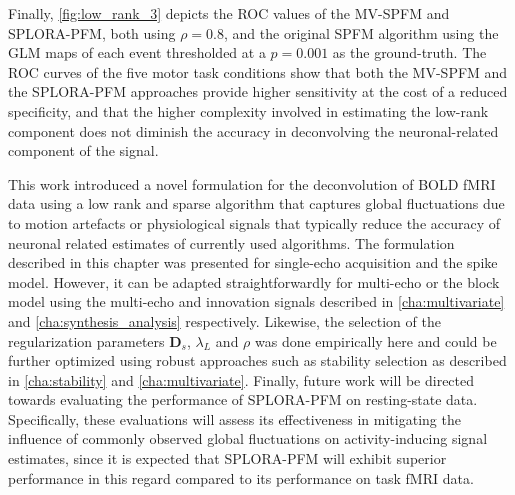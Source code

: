 Finally, \cref{fig:low_rank_3} depicts the ROC values of the MV-SPFM and
SPLORA-PFM, both using $\rho=0.8$, and the original SPFM algorithm using the GLM
maps of each event thresholded at a $p = 0.001$ as the ground-truth. The ROC
curves of the five motor task conditions show that both the MV-SPFM and the
SPLORA-PFM approaches provide higher sensitivity at the cost of a reduced
specificity, and that the higher complexity involved in estimating the low-rank
component does not diminish the accuracy in deconvolving the neuronal-related
component of the signal. 

This work introduced a novel formulation for the deconvolution of BOLD fMRI data
using a low rank and sparse algorithm that captures global fluctuations due to
motion artefacts or physiological signals that typically reduce the accuracy of
neuronal related estimates of currently used algorithms. The formulation
described in this chapter was presented for single-echo acquisition and the
spike model. However, it can be adapted straightforwardly for multi-echo
\citep{CaballeroGaudes2019deconvolutionalgorithmmulti} or the block model
\citep{Karahanoglu2013TotalactivationfMRI,Cherkaoui2019Sparsitybasedblind,Urunuela2023HemodynamicDeconvolutionDemystified}
using the multi-echo and innovation signals described in \cref{cha:multivariate}
and \cref{cha:synthesis_analysis} respectively. Likewise, the selection of the
regularization parameters $\mathbf{D}_s$, $\lambda_L$ and $\rho$ was done
empirically here and could be further optimized using robust approaches such as
stability selection
\citep{Meinshausen2010Stabilityselection,Urunuela2020StabilityBasedSparse} as
described in \cref{cha:stability} and \cref{cha:multivariate}. Finally, future
work will be directed towards evaluating the performance of SPLORA-PFM on
resting-state data. Specifically, these evaluations will assess its
effectiveness in mitigating the influence of commonly observed global
fluctuations on activity-inducing signal estimates, since it is expected that
SPLORA-PFM will exhibit superior performance in this regard compared to its
performance on task fMRI data.
